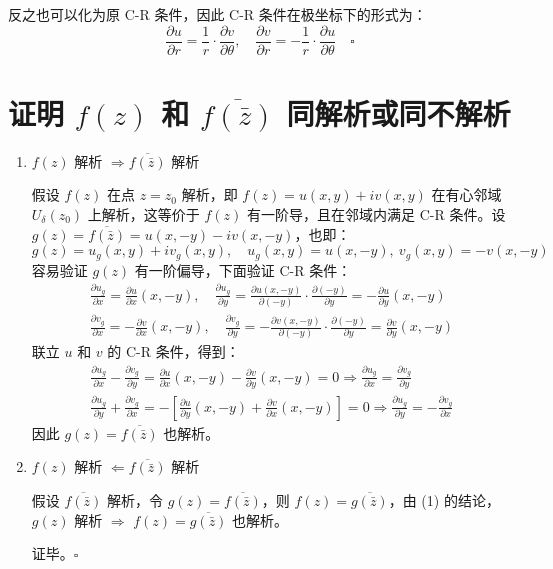 \documentclass[UTF8]{report}
\theoremstyle{MyLineTheoremStyle} %
\theoremstyle{MyBlockTheoremStyle} %
\theoremstyle{MySubsubsectionStyle} %
\begin{document}
反之也可以化为原 C-R 条件，因此 C-R 条件在极坐标下的形式为：
\begin{equation*}
    \frac{\partial u }{\partial r } = \frac{1}{r}\cdot\frac{\partial v }{\partial \theta }, \quad \frac{\partial v }{\partial r } = -\frac{1}{r}\cdot\frac{\partial u }{\partial \theta }\quad \square
\end{equation*}

\section{证明 $f(z)$ 和 $\overline{f(\bar{z})}$ 同解析或同不解析 }
\begin{enumerate}
\item $f(z)$ 解析 $\Longrightarrow \overline{f(\bar{z})}$ 解析

假设 $f(z)$ 在点 $z = z_0$ 解析，即 $f(z) = u(x,y) + iv(x,y)$ 在有心邻域 $U_{\delta}(z_0)$ 上解析，这等价于 $f(z)$ 有一阶导，且在邻域内满足 C-R 条件。设 $g(z) = \overline{f(\bar{z})} = u(x,-y) - iv(x,-y)$，也即：
\begin{equation*}
g(z) = u_g(x,y) + iv_g(x,y),\quad u_g(x,y) = u(x,-y),\ v_g(x,y) = -v(x,-y)
\end{equation*}
容易验证 $g(z)$ 有一阶偏导，下面验证 C-R 条件：
\begin{gather*}
\frac{\partial u_g }{\partial x } = \frac{\partial u}{\partial x }(x,-y) ,\quad
\frac{\partial u_g }{\partial y } = \frac{\partial u(x,-y) }{\partial (-y) }\cdot \frac{\partial (-y) }{\partial y } = -\frac{\partial u }{\partial y }(x,-y) \\ 
\frac{\partial v_g }{\partial x } = -\frac{\partial v}{\partial x }(x,-y) ,\quad
\frac{\partial v_g }{\partial y } = -\frac{\partial v(x,-y) }{\partial (-y) }\cdot \frac{\partial (-y) }{\partial y } = \frac{\partial v }{\partial y }(x,-y) 
\end{gather*}
联立 $u$ 和 $v$ 的 C-R 条件，得到：
\begin{gather*}
\frac{\partial u_g }{\partial x } - \frac{\partial v_g }{\partial y } = \frac{\partial u}{\partial x }(x,-y) - \frac{\partial v }{\partial y }(x,-y) = 0 \Longrightarrow \frac{\partial u_g }{\partial x } = \frac{\partial v_g }{\partial y }
\\ 
\frac{\partial u_g }{\partial y } + \frac{\partial v_g }{\partial x } = -\left[ \frac{\partial u }{\partial y }(x,-y) + \frac{\partial v}{\partial x }(x,-y)\right] = 0
\Longrightarrow 
\frac{\partial u_g }{\partial y } = -\frac{\partial v_g }{\partial x }
\end{gather*}
因此 $g(z) = \overline{f(\bar{z})}$ 也解析。

\item $f(z)$ 解析 $\Longleftarrow \overline{f(\bar{z})}$ 解析

假设 $\overline{f(\bar{z})}$ 解析，令 $g(z) = \overline{f(\bar{z})}$，则 $f(z) = \overline{g(\bar{z})}$，由 (1) 的结论，$g(z)$ 解析 $\Longrightarrow$ $f(z) = \overline{g(\bar{z})}$ 也解析。

证毕。$\square$
\end{enumerate}
\end{document}
